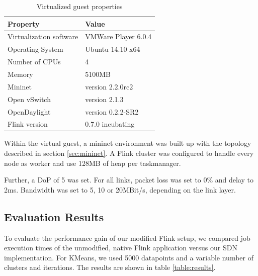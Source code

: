 \begin{table}[h]
    \centering
    \begin{tabular}{| l | l | }
        \hline
        \textbf{Property} & \textbf{Value} \\ \hline
        Virtualization software & VMWare Player 6.0.4 \\ \hline
        Operating System & Ubuntu 14.10 x64 \\ \hline
        Number of CPUs & 4 \\ \hline
        Memory & 5100MB \\ \hline
        Mininet & version 2.2.0rc2 \\ \hline
        Open vSwitch & version 2.1.3 \\ \hline
        OpenDaylight & version 0.2.2-SR2 \\ \hline
        Flink version & 0.7.0 incubating \\ \hline
    \end{tabular}
    \caption{Virtualized guest properties}
    \label{table:guest_properties}
\end{table}

Within the virtual guest, a mininet environment was built up with the topology described in
section \ref{sec:mininet}. A Flink cluster was configured to handle every node as worker and use
128MB of heap per taskmanager.

Further, a DoP of 5 was set. For all links, packet loss was set to 0\% and delay to 2ms. Bandwidth
was set to 5, 10 or 20MBit/s, depending on the link layer.

\subsection{Evaluation Results}
To evaluate the performance gain of our modified Flink setup, we compared job execution times of the
unmodified, native Flink application versus our SDN implementation. For KMeans, we used 5000
datapoints and a variable number of clusters and iterations. The results are shown in table
\ref{table:results}.

